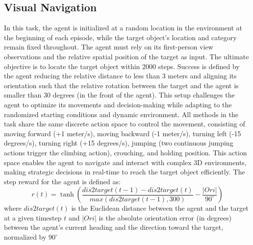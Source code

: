 \subsection{Visual Navigation}
\label{app:navigation_task}
In this task, the agent is initialized at a random location in the environment at the beginning of each episode, while the target object's location and category remain fixed throughout. The agent must rely on its first-person view observations and the relative spatial position of the target as input. The ultimate objective is to locate the target object within 2000 steps. Success is defined by the agent reducing the relative distance to less than 3 meters and aligning its orientation such that the relative rotation between the target and the agent is smaller than 30 degrees (in the front of the agent). This setup challenges the agent to optimize its movements and decision-making while adapting to the randomized starting conditions and dynamic environment. All methods in the task share the same discrete action space to control the movement, consisting of moving forward (+1 meter/s), moving backward (-1 meter/s), turning left (-15 degrees/s), turning right (+15 degrees/s), jumping (two continuous jumping actions trigger the climbing action), crouching, and holding position. This action space enables the agent to navigate and interact with complex 3D environments, making strategic decisions in real-time to reach the target object efficiently. The step reward for the agent is defined as:
\begin{equation}
    r(t) = \tanh ( \frac{dis2target(t-1)-dis2target(t)}{max(dis2target(t-1),300)} - \frac{|Ori|}{90 ^{\circ}} )
\end{equation}
where $dis2target(t)$ is the Euclidean distance between the agent and the target at a given timestep $t$ and $|Ori|$ is the absolute orientation error (in degrees) between the agent's current heading and the direction toward the target, normalized by $90^{\circ}$
